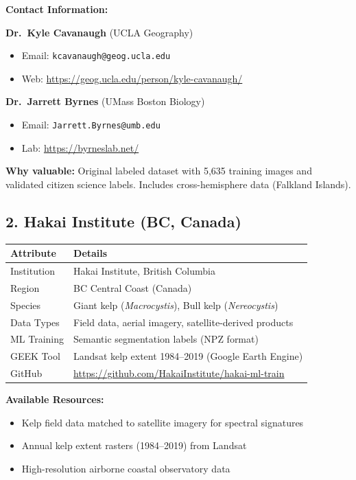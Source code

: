 \documentclass[11pt]{article}
\begin{document}
\vspace{0.5em}
\textbf{Contact Information:}

\textbf{Dr.\ Kyle Cavanaugh} (UCLA Geography)
\begin{itemize}[nosep]
  \item Email: \texttt{kcavanaugh@geog.ucla.edu}
  \item Web: \url{https://geog.ucla.edu/person/kyle-cavanaugh/}
\end{itemize}

\textbf{Dr.\ Jarrett Byrnes} (UMass Boston Biology)
\begin{itemize}[nosep]
  \item Email: \texttt{Jarrett.Byrnes@umb.edu}
  \item Lab: \url{https://byrneslab.net/}
\end{itemize}

\textbf{Why valuable:} Original labeled dataset with 5,635 training images and validated citizen science labels. Includes cross-hemisphere data (Falkland Islands).

\subsection{2. Hakai Institute (BC, Canada)}

\begin{tabular}{p{4cm}p{10cm}}
\toprule
\textbf{Attribute} & \textbf{Details} \\
\midrule
Institution & Hakai Institute, British Columbia \\
Region & BC Central Coast (Canada) \\
Species & Giant kelp (\textit{Macrocystis}), Bull kelp (\textit{Nereocystis}) \\
Data Types & Field data, aerial imagery, satellite-derived products \\
ML Training & Semantic segmentation labels (NPZ format) \\
GEEK Tool & Landsat kelp extent 1984--2019 (Google Earth Engine) \\
GitHub & \url{https://github.com/HakaiInstitute/hakai-ml-train} \\
\bottomrule
\end{tabular}

\vspace{0.5em}
\textbf{Available Resources:}
\begin{itemize}[nosep]
  \item Kelp field data matched to satellite imagery for spectral signatures
  \item Annual kelp extent rasters (1984--2019) from Landsat
  \item High-resolution airborne coastal observatory data
\end{itemize}
\end{document}
